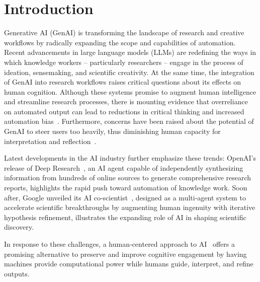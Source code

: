 \section{Introduction}
Generative AI (GenAI) is transforming the landscape of research and creative workflows by radically expanding the scope and capabilities of automation. Recent advancements in large language models (LLMs) are redefining the ways in which knowledge workers -- particularly researchers -- engage in the process of ideation, sensemaking, and scientific creativity. At the same time, the integration of GenAI into research workflows raises critical questions about its effects on human cognition. Although these systems promise to augment human intelligence and streamline research processes, there is mounting evidence that overreliance on automated output can lead to reductions in critical thinking and increased automation bias~\cite{lee2025impact,passi2022overreliance}. Furthermore, concerns have been raised about the potential of GenAI to steer users too heavily, thus diminishing human capacity for interpretation and reflection~\cite{10.1145/3544548.3581066}. 

Latest developments in the AI industry further emphasize these trends: OpenAI's release of Deep Research~\cite{openai2025deepresearch}, an AI agent capable of independently synthesizing information from hundreds of online sources to generate comprehensive research reports, highlights the rapid push toward automation of knowledge work. Soon after, Google unveiled its AI co-scientist~\cite{google2025aicoScientist}, designed as a multi-agent system to accelerate scientific breakthroughs by augmenting human ingenuity with iterative hypothesis refinement, illustrates the expanding role of AI in shaping scientific discovery.

In response to these challenges, a human‐centered approach to AI~\cite{shneiderman2020human} offers a promising alternative to preserve and improve cognitive engagement by having machines provide computational power while humans guide, interpret, and refine outputs.

